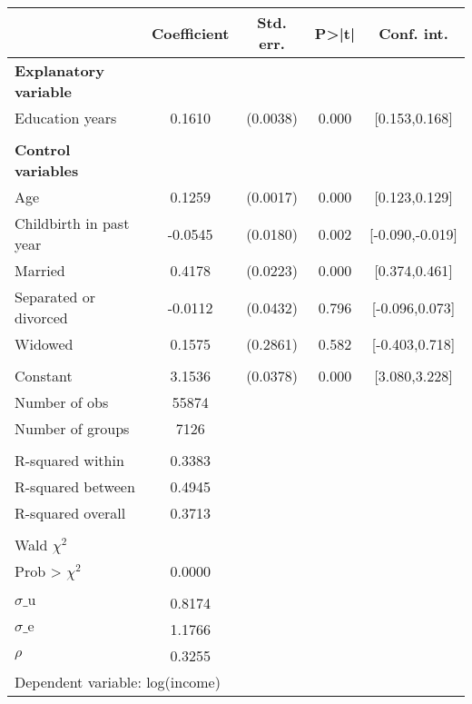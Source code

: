 {
\def\sym#1{\ifmmode^{#1}\else\(^{#1}\)\fi}
\begin{tabular}{l*{1}{cccc}}
\toprule
                    & Coefficient&   Std. err.&       P>|t|&  Conf. int.\\
\midrule
\textbf{Explanatory variable}&            &            &            &            \\
Education years     &      0.1610&    (0.0038)&       0.000&[0.153,0.168]\\
\\ \textbf{Control variables}&            &            &            &            \\
Age                 &      0.1259&    (0.0017)&       0.000&[0.123,0.129]\\
Childbirth in past year&     -0.0545&    (0.0180)&       0.002&[-0.090,-0.019]\\
Married             &      0.4178&    (0.0223)&       0.000&[0.374,0.461]\\
Separated or divorced&     -0.0112&    (0.0432)&       0.796&[-0.096,0.073]\\
Widowed             &      0.1575&    (0.2861)&       0.582&[-0.403,0.718]\\
                    &            &            &            &            \\
Constant            &      3.1536&    (0.0378)&       0.000&[3.080,3.228]\\
\midrule
Number of obs       &       55874&            &            &            \\
Number of groups    &        7126&            &            &            \\
\\ R-squared within &      0.3383&            &            &            \\
R-squared between   &      0.4945&            &            &            \\
R-squared overall   &      0.3713&            &            &            \\
\\ Wald $\chi^2$    &            &            &            &            \\
Prob > $\chi^2$     &      0.0000&            &            &            \\
\\ $\sigma\text{\_u}$&      0.8174&            &            &            \\
$\sigma\text{\_e}$   &      1.1766&            &            &            \\
$\rho$              &      0.3255&            &            &            \\
\bottomrule
\multicolumn{5}{l}{\footnotesize Dependent variable: log(income)}\\
\end{tabular}
}
